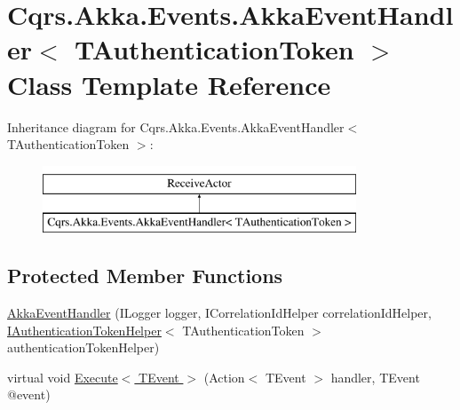 \hypertarget{classCqrs_1_1Akka_1_1Events_1_1AkkaEventHandler}{}\section{Cqrs.\+Akka.\+Events.\+Akka\+Event\+Handler$<$ T\+Authentication\+Token $>$ Class Template Reference}
\label{classCqrs_1_1Akka_1_1Events_1_1AkkaEventHandler}
Inheritance diagram for Cqrs.\+Akka.\+Events.\+Akka\+Event\+Handler$<$ T\+Authentication\+Token $>$\+:\begin{figure}[H]
\begin{center}
\leavevmode
\includegraphics[height=2.000000cm]{classCqrs_1_1Akka_1_1Events_1_1AkkaEventHandler}
\end{center}
\end{figure}
\subsection*{Protected Member Functions}
\begin{DoxyCompactItemize}
\item 
\hyperlink{classCqrs_1_1Akka_1_1Events_1_1AkkaEventHandler_aee50c0ed50e291f311721ca6a103c41f}{Akka\+Event\+Handler} (I\+Logger logger, I\+Correlation\+Id\+Helper correlation\+Id\+Helper, \hyperlink{interfaceCqrs_1_1Authentication_1_1IAuthenticationTokenHelper}{I\+Authentication\+Token\+Helper}$<$ T\+Authentication\+Token $>$ authentication\+Token\+Helper)
\item 
virtual void \hyperlink{classCqrs_1_1Akka_1_1Events_1_1AkkaEventHandler_af277504938e0513e05f3a8784ece2af2}{Execute$<$ T\+Event $>$} (Action$<$ T\+Event $>$ handler, T\+Event @event)
\end{DoxyCompactItemize}

